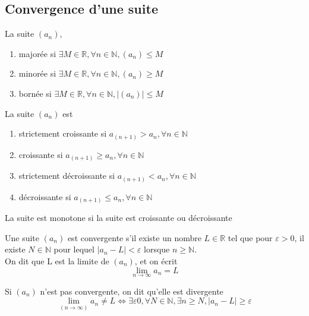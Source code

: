 \documentclass{article}
\begin{document}
\subsection{Convergence d'une suite}


\begin{definition}
    La suite $(a_n)$,
    \begin{enumerate}
	\item majorée si $\exists M \in \mathbb{R}, \forall n \in \mathbb{N},
	    (a_n) \leq M$
	\item minorée si $\exists M \in \mathbb{R}, \forall n \in \mathbb{N},
	    (a_n) \geq M$
	\item bornée si $\exists M \in \mathbb{R}, \forall n \in \mathbb{N},
	    |(a_n)| \leq M$
    \end{enumerate}
\end{definition}

\begin{definition}
    La suite $(a_n)$ est
    \begin{enumerate}
	\item strictement croissante si $a_(n+1) > a_n, \forall n \in \mathbb{N}$
	\item croissante si $a_(n+1) \geq a_n, \forall n \in \mathbb{N}$
	\item strictement décroissante si $a_(n+1) < a_n, \forall n \in \mathbb{N}$
	\item décroissante si $a_(n+1) \leq a_n, \forall n \in \mathbb{N}$
    \end{enumerate}
\end{definition}

\begin{definition}
    La suite est monotone si la suite est croissante ou décroissante
\end{definition}

\begin{definition}
    Une suite $(a_n)$ est convergente s'il existe un nombre $L \in \mathbb{R}$
    tel que pour $\varepsilon > 0$, il existe $N \in \mathbb{N}$ pour lequel
    $|a_n - L| < \varepsilon$ lorsque $n \geq \mathbb{N}$.\\
    On dit que L est la limite de $(a_n)$, et on écrit
    $$ \lim_{n \to \infty} a_n = L$$
\end{definition}

\begin{definition}
    Si $(a_n)$ n'est pas convergente, on dit qu'elle est divergente
    $$ \lim_(n \to \infty) a_n \neq L \Longleftrightarrow \exists \varepsilon 0,
    \forall N \in \mathbb{N}, \exists n \geq N, |a_n - L | \geq \varepsilon$$
\end{definition}
\end{document}
